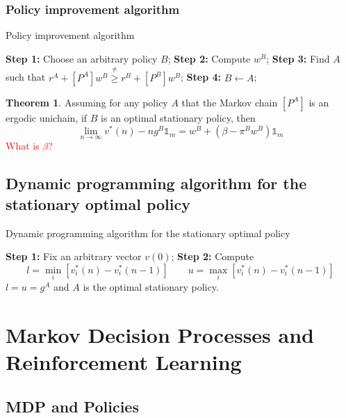 \documentclass[12pt, openany]{report}
\theoremstyle{definition}
\newtheorem{thm}{Theorem}[chapter]
\begin{document}
\subsection{Policy improvement algorithm}
\begin{algorithm}
	\caption{Policy improvement algorithm}
	\begin{algorithmic}[1]
		\State \textbf{Step 1:} Choose an arbitrary policy $B$;
		\State \textbf{Step 2:} Compute $w^B$;
		\State \textbf{Step 3:} Find $A$ such that $r^A + [P^A]w^B \stackrel{\neq}{\ge} r^B +[P^B]w^B$;
		\State \textbf{Step 4:} $B\gets A$;
		\EndWhile
	\end{algorithmic}
\end{algorithm}
\begin{thm}
	Assuming for any policy $A$ that the Markov chain $[P^A]$ is an ergodic unichain, if $B$ is an optimal stationary policy, then 
	\begin{equation}
		\lim_{n\to \infty} v^*(n) - ng^B\mathbb{1}_m = w^B + (\beta - \pi^B w^B)\mathbb{1}_m
	\end{equation}
	\textcolor{red}{What is $\beta$?}
\end{thm}
\section{Dynamic programming algorithm for the stationary optimal policy}
\begin{algorithm}
	\caption{Dynamic programming algorithm for the stationary optimal policy}
	\begin{algorithmic}[1]
		\State \textbf{Step 1:} Fix an arbitrary vector $v(0)$;
		\State \textbf{Step 2:} Compute 
		\begin{equation}
			l = \min_i [v_i^*(n)-v_i^*(n-1)] \qquad u = \max_i [v_i^*(n)-v_i^*(n-1)]
		\end{equation}
		\EndWhile
		\State $l=u=g^A$ and $A$ is the optimal stationary policy.
	\end{algorithmic}
\end{algorithm}
\chapter{Markov Decision Processes and Reinforcement Learning}
\section{MDP and Policies}
\end{document}
